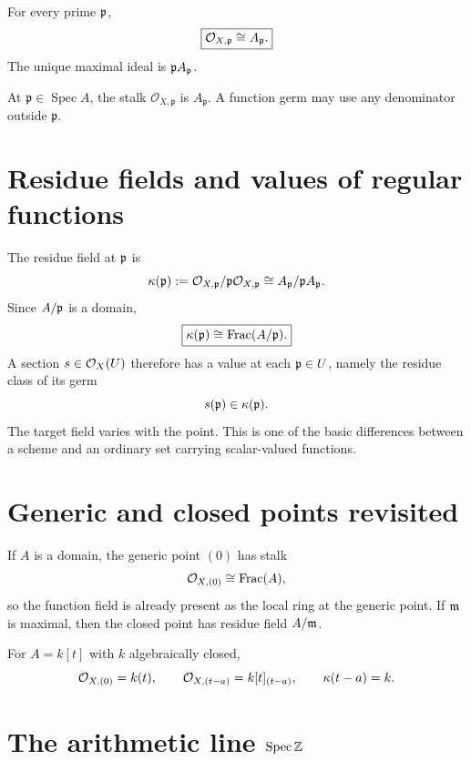 \begin{theorem}\label{thm:vi17-stalk}
For every prime $\mathfrak p$,
\[
\boxed{\mathcal O_{X,\mathfrak p}\cong A_{\mathfrak p}.}
\]
The unique maximal ideal is $\mathfrak p A_{\mathfrak p}$.
\end{theorem}



\begin{example}\label{ex:vi17-expand-02}
At $\mathfrak p\in\operatorname{Spec}A$, the stalk $\mathcal O_{X,\mathfrak p}$ is $A_{\mathfrak p}$.  A function germ may use any denominator outside $\mathfrak p$.
\end{example}
\section{Residue fields and values of regular functions}

The residue field at $\mathfrak p$ is
\[
\kappa(\mathfrak p)
:=\mathcal O_{X,\mathfrak p}/\mathfrak p\mathcal O_{X,\mathfrak p}
\cong A_{\mathfrak p}/\mathfrak p A_{\mathfrak p}.
\]
Since $A/\mathfrak p$ is a domain,
\[
\boxed{\kappa(\mathfrak p)\cong\operatorname{Frac}(A/\mathfrak p).}
\]
A section $s\in\mathcal O_X(U)$ therefore has a value at each $\mathfrak p\in U$, namely the residue
class of its germ
\[
s(\mathfrak p)\in\kappa(\mathfrak p).
\]
The target field varies with the point.  This is one of the basic differences between a
scheme and an ordinary set carrying scalar-valued functions.

\section{Generic and closed points revisited}

If $A$ is a domain, the generic point $(0)$ has stalk
\[
\mathcal O_{X,(0)}\cong\operatorname{Frac}(A),
\]
so the function field is already present as the local ring at the generic point.  If
$\mathfrak m$ is maximal, then the closed point has residue field $A/\mathfrak m$.

For $A=k[t]$ with $k$ algebraically closed,
\[
\mathcal O_{X,(0)}=k(t),
\qquad
\mathcal O_{X,(t-a)}=k[t]_{(t-a)},
\qquad
\kappa(t-a)=k.
\]



\section{The arithmetic line \texorpdfstring{$\operatorname{Spec}\mathbb Z$}{Spec Z}}

